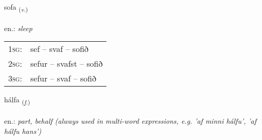 \documentclass[frontgrid, backgrid]{flacards}\usepackage[]{graphicx}\usepackage[]{xcolor}
\begin{document}
\renewcommand{\flhead}{\vskip5pt \fboxsep=0pt {\small\bfseries\footnotesize Sagnorð | Verb}}
\renewcommand{\fcfoot}{\vskip5pt \fboxsep=0pt \hspace{2pt}{\small\bfseries\footnotesize 1K}}

\renewcommand{\blhead}{\vskip5pt {\small\bfseries\footnotesize Sagnorð | Verb }}
\renewcommand{\bcfoot}{\vskip5pt \hspace{2pt}{\small\bfseries\footnotesize 1K}}


{sofa \small{\textsubscript{(\textit{v.})}} \\[1ex] %
\textphonetic{[sɔːva]} \\
en.: \emph{sleep} \\  [2ex]
\renewcommand*{\arraystretch}{0.8}
\begin{tabular}{p{1cm}l}
\textsc{1sg}: & sef -- svaf -- sofið \\ 
\textsc{2sg}: & sefur -- svafst -- sofið \\ 
\textsc{3sg}: & sefur -- svaf -- sofið \\ 
\end{tabular}
}

\renewcommand{\flhead}{\vskip5pt \fboxsep=0pt {\small\bfseries\footnotesize Nafnorð | Noun}}
\renewcommand{\fcfoot}{\vskip5pt \fboxsep=0pt \hspace{2pt}{\small\bfseries\footnotesize 1K}}

\renewcommand{\blhead}{\vskip5pt {\small\bfseries\footnotesize Nafnorð | Noun }}
\renewcommand{\bcfoot}{\vskip5pt \hspace{2pt}{\small\bfseries\footnotesize 1K}}


{hálfa \small{\textsubscript{(\textit{f.})}} \\[1ex] %
\textphonetic{[haulva]} \\
en.: \emph{part, behalf (always used in multi-word expressions, e.g.  'af minni hálfu', 'af hálfu hans')} \\  [2ex]
\renewcommand*{\arraystretch}{0.8}
}
\end{document}
